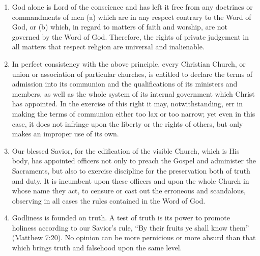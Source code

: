 \documentclass[
]{book}
\begin{document}
\begin{enumerate}
\def\labelenumi{\arabic{enumi}.}
\item
  God alone is Lord of the conscience and has left it free from any doctrines or commandments of men (a) which are in any respect contrary to the Word of God, or (b) which, in regard to matters of faith and worship, are not governed by the Word of God. Therefore, the rights of private judgement in all matters that respect religion are universal and inalienable.
\item
  In perfect consistency with the above principle, every Christian Church, or union or association of particular churches, is entitled to declare the terms of admission into its communion and the qualifications of its ministers and members, as well as the whole system of its internal government which Christ has appointed. In the exercise of this right it may, notwithstanding, err in making the terms of communion either too lax or too narrow; yet even in this case, it does not infringe upon the liberty or the rights of others, but only makes an improper use of its own.
\item
  Our blessed Savior, for the edification of the visible Church, which is His body, has appointed officers not only to preach the Gospel and administer the Sacraments, but also to exercise discipline for the preservation both of truth and duty. It is incumbent upon these officers and upon the whole Church in whose name they act, to censure or cast out the erroneous and scandalous, observing in all cases the rules contained in the Word of God.
\item
  Godliness is founded on truth. A test of truth is its power to promote holiness according to our Savior's rule, ``By their fruits ye shall know them'' (Matthew 7:20). No opinion can be more pernicious or more absurd than that which brings truth and falsehood upon the same level.


\end{enumerate}
\end{document}
